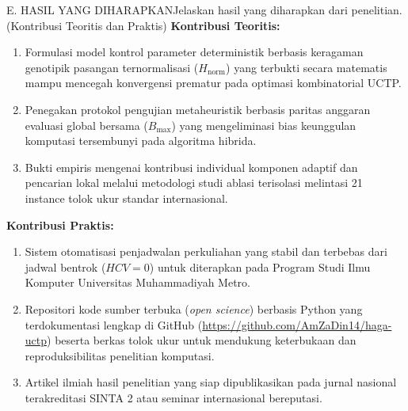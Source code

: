 \documentclass[letterpaper,12pt,oneside]{article}
\begin{document}
\vspace{-1.2pt}%
\noindent\begin{wordsection}{E. HASIL YANG DIHARAPKAN}{Jelaskan hasil yang diharapkan dari penelitian. (Kontribusi Teoritis dan Praktis)}
\noindent\textbf{Kontribusi Teoritis:}
\begin{enumerate}
    \item Formulasi model kontrol parameter deterministik berbasis keragaman genotipik pasangan ternormalisasi ($H_{\text{norm}}$) yang terbukti secara matematis mampu mencegah konvergensi prematur pada optimasi kombinatorial UCTP.
    \item Penegakan protokol pengujian metaheuristik berbasis paritas anggaran evaluasi global bersama ($B_{\max}$) yang mengeliminasi bias keunggulan komputasi tersembunyi pada algoritma hibrida.
    \item Bukti empiris mengenai kontribusi individual komponen adaptif dan pencarian lokal melalui metodologi studi ablasi terisolasi melintasi 21 instance tolok ukur standar internasional.
\end{enumerate}

\noindent\textbf{Kontribusi Praktis:}
\begin{enumerate}
    \item Sistem otomatisasi penjadwalan perkuliahan yang stabil dan terbebas dari jadwal bentrok ($HCV = 0$) untuk diterapkan pada Program Studi Ilmu Komputer Universitas Muhammadiyah Metro.
    \item Repositori kode sumber terbuka (\textit{open science}) berbasis Python yang terdokumentasi lengkap di GitHub (\url{https://github.com/AmZaDin14/haga-uctp}) beserta berkas tolok ukur untuk mendukung keterbukaan dan reproduksibilitas penelitian komputasi.
    \item Artikel ilmiah hasil penelitian yang siap dipublikasikan pada jurnal nasional terakreditasi SINTA 2 atau seminar internasional bereputasi.
\end{enumerate}
\end{wordsection}%
\vspace{-1.2pt}%
\end{document}
